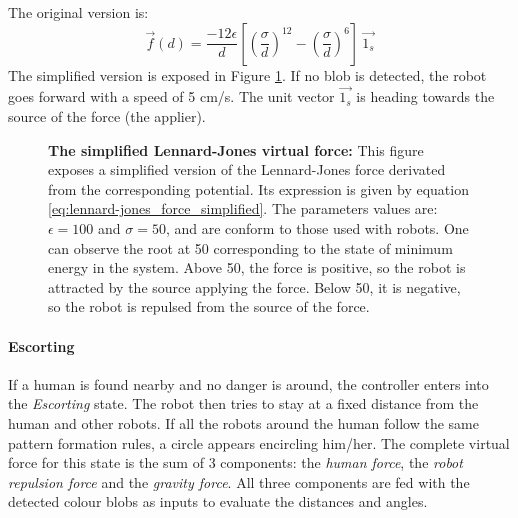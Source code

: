 \documentclass[oneside, a4paper, 12pt]{memoir}
\let\oldCaption\caption
\renewcommand{\caption}[2]{
\oldCaption[#1]{{\small\sffamily\bfseries #1:} #2}
}
\begin{document}
				The original version is:
				\begin{equation}
					\vec{f}(d) = \frac{-12\epsilon}{d} \left[ \left(\frac{\sigma}{d}\right)^{12} - \left(\frac{\sigma}{d}\right)^6 \right] ~\vec{1_s}
				\end{equation}
				 The simplified version is exposed in Figure \ref{fig:lennard-jones_force_simplified}. If no blob is detected, the robot goes forward with a speed of 5 cm/s. The unit vector $\vec{1_s}$ is heading towards the source of the force (the applier).
				
				\begin{figure}[!htp]\centering
					
					\caption{The simplified Lennard-Jones virtual force}{This figure exposes a simplified version of the Lennard-Jones force derivated from the corresponding potential. Its expression is given by equation \ref{eq:lennard-jones_force_simplified}. The parameters values are: $\epsilon=100$ and $\sigma=50$, and are conform to those used with robots. One can observe the root at 50 corresponding to the state of minimum energy in the system. Above 50, the force is positive, so the robot is attracted by the source applying the force. Below 50, it is negative, so the robot is repulsed from the source of the force.}
					\label{fig:lennard-jones_force_simplified}
				\end{figure}
			
			\paragraph{Escorting}
			
			If a human is found nearby and no danger is around, the controller enters into the \emph{Escorting} state. The robot then tries to stay at a fixed distance from the human and other robots. If all the robots around the human follow the same pattern formation rules, a circle appears encircling him/her. The complete virtual force for this state is the sum of 3 components: the \emph{human force}, the \emph{robot repulsion force} and the \emph{gravity force}. All three components are fed with the detected colour blobs as inputs to evaluate the distances and angles.
			
\end{document}
